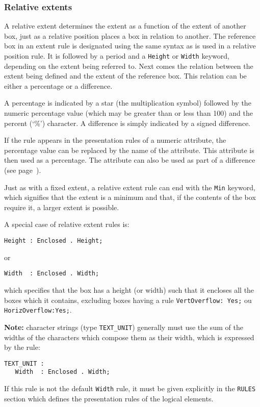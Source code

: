\subsubsection{Relative extents}

A relative extent determines the extent as a function of the extent of
another box, just as a relative position places a box in relation to
another.  The reference box in an extent rule is designated using the
same syntax as is used in a relative position rule.  It is followed by
a period and a {\tt Height} or {\tt Width} keyword, depending on the
extent being referred to.  Next comes the relation between the
extent being defined and the extent of the reference box.  This
relation can be either a percentage or a difference.

A percentage is indicated by a star (the multiplication symbol)
followed by the numeric percentage value (which may be greater than or
less than 100) and the percent (`\%') character.  A difference
is simply indicated by a signed difference.

If the rule appears in the presentation rules of a numeric attribute,
the percentage value can be replaced by the name of the attribute.
This attribute is then used as a percentage.  The attribute can also
be used as part of a difference (see page~\pageref{distance}).

Just as with a fixed extent, a relative extent rule can end with the
{\tt Min} keyword, which signifies that the extent is a minimum and
that, if the contents of the box require it, a larger extent is
possible.

A special case of relative extent rules is:
\begin{verbatim}
Height : Enclosed . Height;
\end{verbatim}
or
\begin{verbatim}
Width  : Enclosed . Width;
\end{verbatim}
which specifies that the box has a height (or width) such that it
encloses all the boxes which it contains, excluding boxes having  a rule
{\tt VertOverflow: Yes;} ou {\tt HorizOverflow:Yes;}.

{\bf Note:} character strings (type {\tt TEXT\_UNIT}) generally must
use the sum of the widths of the characters which compose them as
their width, which is expressed by the rule:
\begin{verbatim}
TEXT_UNIT :
   Width  : Enclosed . Width;
\end{verbatim}
If this rule is not the default {\tt Width} rule, it must be given
explicitly in the {\tt RULES} section which defines the presentation
rules of the logical elements.

